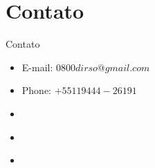 \section{Contato}

\begin{frame}	
	\begin{block}{Contato}	
		\begin{itemize}
			\item E-mail: $0800dirso@gmail.com$
			\item Phone: $+55 11 9444-26191$
			\item \href{https://www.linkedin.com/in/adilson-khouri-51893918/}{\color{blue}{Linkedin}}
			\item \href{http://lattes.cnpq.br/2654721135214993}{\color{blue}{Curriculum Lattes}}
			\item \href{https://github.com/khouri/Apresentacao_Cusco}{\color{blue}{Código fonte GitHub}}
		\end{itemize}
	\end{block}
\end{frame}
